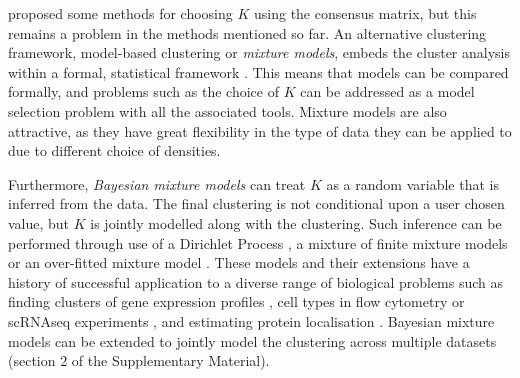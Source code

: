 \documentclass{article}
\begin{document}
\cite{monti2003consensus} proposed some methods for choosing $K$ using the consensus matrix, but this remains a problem in the methods mentioned so far. An alternative clustering framework, model-based clustering or \emph{mixture models}, embeds the cluster analysis within a formal, statistical framework \citep{fraley2002model}. This means that models can be compared formally, and problems such as the choice of $K$ can be addressed as a model selection problem with all the associated tools. Mixture models are also attractive, as they have great flexibility in the type of data they can be applied to due to different choice of densities.

Furthermore, \emph{Bayesian mixture models} can treat $K$ as a random variable that is inferred from the data. The final clustering is not conditional upon a user chosen value, but $K$ is jointly modelled along with the clustering. Such inference can be performed through use of a Dirichlet Process \citep{ferguson1973bayesian}, a mixture of finite mixture models \citep{richardson1997bayesian, miller2018mixture} or an over-fitted mixture model \citep{rousseau2011asymptotic}. These models and their extensions have a history of successful application to a diverse range of biological problems such as finding clusters of gene expression profiles \citep{medvedovic2002bayesian}, cell types in flow cytometry \citep{chan2008statistical, hejblum2019sequential} or scRNAseq experiments \citep{prabhakaran2016dirichlet}, and estimating protein localisation \citep{crook2018bayesian}. Bayesian mixture models can be extended to jointly model the clustering across multiple datasets \citep{kirk2012bayesian, gabasova2017clusternomics} (section 2 of the Supplementary Material).


\end{document}
